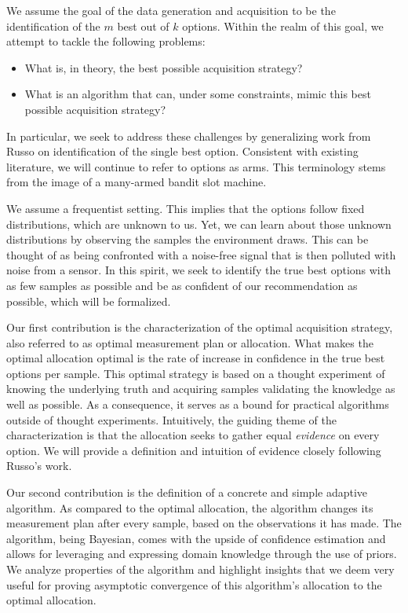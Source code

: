 We assume the goal of the data generation and acquisition to be the
identification of the $m$ best out of $k$ options. Within the realm of this
goal, we attempt to tackle the following problems:
\begin{itemize}
  \item What is, in theory, the best possible acquisition strategy?
  \item What is an algorithm that can, under some constraints, mimic this best possible acquisition strategy?
\end{itemize}
In particular, we seek to address these challenges by generalizing work from
Russo \cite{DBLP:journals/corr/Russo16} on identification of the single best
option. Consistent with existing literature, we will continue to refer to
options as arms. This terminology stems from the image of a many-armed bandit
slot machine.

We assume a frequentist setting. This implies that the options follow fixed
distributions, which are unknown to us. Yet, we can learn about those unknown
distributions by observing the samples the environment draws. This can be
thought of as being confronted with a noise-free signal that is then polluted
with noise from a sensor. In this spirit, we seek to identify the true best
options with as few samples as possible and be as confident of our
recommendation as possible, which will be formalized.

Our first contribution is the characterization of the optimal acquisition
strategy, also referred to as optimal measurement plan or allocation. What makes
the optimal allocation optimal is the rate of increase in confidence in the true
best options per sample. This optimal strategy is based on a thought experiment
of knowing the underlying truth and acquiring samples validating the knowledge
as well as possible. As a consequence, it serves as a bound for practical
algorithms outside of thought experiments. Intuitively, the guiding theme of the
characterization is that the allocation seeks to gather equal \emph{evidence} on
every option. We will provide a definition and intuition of evidence closely
following Russo's work.

Our second contribution is the definition of a concrete and simple adaptive
algorithm. As compared to the optimal allocation, the algorithm changes its
measurement plan after every sample, based on the observations it has made. The
algorithm, being Bayesian, comes with the upside of confidence estimation and
allows for leveraging and expressing domain knowledge through the use of priors.
We analyze properties of the algorithm and highlight insights that we deem very
useful for proving asymptotic convergence of this algorithm's allocation to the
optimal allocation.

